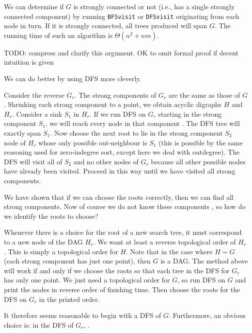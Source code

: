 

We can determine if $G$ is strongly connected or not (i.e., has a single strongly connected component) 
by running \texttt{BFSvisit} or \texttt{DFSvisit} originating from each node in turn. 
If it is strongly connected, all trees produced will span $G$. 
The running time of such an algorithm is $\Theta(n^2+nm)$.

{\color{red} TODO: compress and clarify this argument. OK to omit formal proof if decent intuition is given}

We can do better by using DFS more cleverly. 

Consider the reverse $G_r$. The strong components of $G_r$ are the
same as those of $G$. Shrinking each strong component to a point,
we obtain  acyclic digraphs $H$ and $H_r$. Consider a sink $S_1$ in
$H_r$. If we run DFS on $G_r$ starting  in the strong component
$S_1$, we will reach every node in that component . The DFS tree will exactly span $S_1$. Now
choose the next root to lie in the strong component $S_2$ node of
$H_r$ whose only possible out-neighbour is $S_1$ (this is possible
by the same reasoning used for zero-indegree sort, except here we
deal with outdegree). The DFS will visit all of $S_2$ and no other
nodes of $G_r$ because all other possible nodes have already been
visited. Proceed in this way until we have visited all strong
components.

We have shown that if we can choose the roots correctly, then we can
find all strong components. Now of course we do not know these components
, so how do we identify the roots to choose?

Whenever there is a choice for the root of a new search tree, it must
correspond to a new node of the DAG $H_r$. We want at least a reverse
topological order of $H_r$. This is simply a topological order for
$H$. Note that in the case where $H=G$ (each strong component has just
one point), then $G$ is a DAG. The method above will work if and only
if we choose the roots so that each tree in the DFS for $G_r$ has only
one point. We just need a topological order for $G$, so run DFS on $G$
and print the nodes in reverse order of finishing time. Then choose the
roots for the DFS on $G_r$ in the printed order.

It therefore seems reasonable to begin with a DFS of $G$. Furthermore,
an obvious choice is: in the DFS of $G_r$, .

